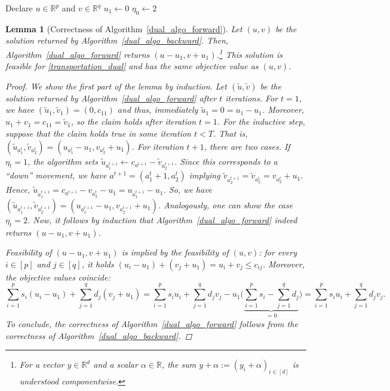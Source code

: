 \documentclass[letterpaper]{article}
\newtheorem{lemma}[theorem]{Lemma}
\begin{document}
\begin{algorithm}[ht]
\caption{Dual forward recursion}\label{dual_algo_forward}
\DontPrintSemicolon
Declare $u \in \mathbb{R}^p$ and $v \in \mathbb{R}^q$\;
$u_1 \gets 0$\;
$\eta_0 \gets 2$ 
\end{algorithm}

\begin{lemma}[Correctness of Algorithm~\ref{dual_algo_forward}]\label{lemma_correctness}
    Let $(u, v)$ be the solution returned by Algorithm~\ref{dual_algo_backward}. Then, Algorithm~\ref{dual_algo_forward} returns $(u-u_1, v+u_1)$.\footnote{For a vector $y \in \mathbb{R}^d$ and a scalar $\alpha \in \mathbb{R}$, the sum $y + \alpha := (y_i + \alpha)_{i \in [d]}$ is understood componentwise.} This solution is feasible for \eqref{transportation_dual} and has the same objective value as $(u, v)$.
    \begin{proof}
        We show the first part of the lemma by induction. Let $(\tilde{u}, \tilde{v})$ be the solution returned by Algorithm~\ref{dual_algo_forward} after $t$ iterations. For $t = 1$, we have $(\tilde{u}_1, \tilde{v}_1) = (0, c_{11})$ and thus, immediately $\tilde{u}_1 = 0 = u_1 - u_1$. Moreover, $u_1 + v_1 = c_{11} = \tilde{v}_1$, so the claim holds after iteration $t = 1$. For the inductive step, suppose that the claim holds true in some iteration $t < T$. That is, $(\tilde{u}_{a_1^t}, \tilde{v}_{a_2^t}) = (u_{a_1^t} - u_1, v_{a_2^t} + u_1)$. For iteration $t+1$, there are two cases. If $\eta_t = 1$, the algorithm sets $\tilde{u}_{a_1^{t+1}} \gets c_{a^{t+1}} - \tilde{v}_{a_2^{t+1}}$. Since this corresponds to a \enquote{down} movement, we have $a^{t+1} = (a^t_1 + 1, a^t_2)$ implying $\tilde{v}_{a_2^{t+1}} = \tilde{v}_{a_2^{t}} = v_{a_2^t} + u_1$. Hence, $\tilde{u}_{a_1^{t+1}} = c_{a^{t+1}} - v_{a_2^t} - u_1 = u_{a_1^{t+1}} - u_1$. So, we have
        $(\tilde{u}_{a_1^{t+1}}, \tilde{v}_{a_2^{t+1}}) = (u_{a_1^{t+1}} - u_1, v_{a_2^{t+1}} + u_1)$. Analogously, one can show the case $\eta_t = 2$. Now, it follows by induction that Algorithm~\ref{dual_algo_forward} indeed returns $(u-u_1, v+u_1)$.

        Feasibility of $(u-u_1, v+u_1)$ is implied by the feasibility of $(u, v)$: for every $i \in [p]$ and $j \in [q]$, it holds $(u_i - u_1) + (v_j + u_1) = u_i + v_j \leq c_{ij}$. Moreover, the objective values coincide:
        \begin{equation*}
            \sum_{i = 1}^p s_i (u_i-u_1) + \sum_{j = 1}^q d_j (v_j + u_1) = \sum_{i = 1}^p s_i u_i + \sum_{j = 1}^q d_j v_j - u_1 \Bigg( \underbrace{\sum_{i = 1}^p s_i - \sum_{j = 1}^q d_j}_{=0} \Bigg)= \sum_{i = 1}^p s_i u_i + \sum_{j = 1}^q d_j v_j.
        \end{equation*}
        To conclude, the correctness of Algorithm~\ref{dual_algo_forward} follows from the correctness of Algorithm~\ref{dual_algo_backward}.
    \end{proof}
\end{lemma}
\end{document}
